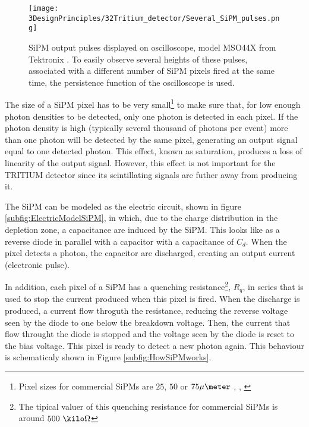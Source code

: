 \begin{figure}[h]
\centering
\texttt{[image: 3DesignPrinciples/32Tritium\_detector/Several\_SiPM\_pulses.png]}
\caption{SiPM output pulses displayed on oscilloscope, model MSO44X from Tektronix \cite{Oscilloscope}. To easily observe several heights of these pulses, associated with a different number of  SiPM pixels fired at the same time, the persistence function of the oscilloscope is used.\label{fig:PulsesOfSiPM}}
\end{figure}

The size of a SiPM pixel has to be very small\footnote{Pixel sizes for commercial SiPMs are $25$, $50$ or $75\mu\meter$ \cite{DataSheetHammamatsu_1_SiPM_25}, \cite{DataSheetHammamatsu_1_SiPM_50}, \cite{DataSheetHammamatsu_1_SiPM_75}} to make sure that, for low enough photon densities to be detected, only one photon is detected in each pixel. If the photon density is high (typically several thousand of photons per event) more than one photon will be detected by the same pixel, generating an output signal equal to one detected photon. This effect, known as saturation, produces a loss of linearity of the output signal. However, this effect is not important for the TRITIUM detector since its scintillating signals are futher away from producing it. %

The SiPM can be modeled as the electric circuit, shown in figure \ref{subfig:ElectricModelSiPM}, in which, due to the charge distribution in the depletion zone, a capacitance are induced by the SiPM. This looks like as a reverse diode in parallel with a capacitor with a capacitance of $C_d$. When the pixel detects a photon, the capacitor are discharged, creating an output current (electronic pulse).

In addition, each pixel of a SiPM has a quenching resistance\footnote{The tipical valuer of this quenching resistance for commercial SiPMs is around $500~\kilo\Omega$}, $R_q$, in series that is used to stop the current produced when this pixel is fired. When the discharge is produced, a current flow throguth the resistance, reducing the reverse voltage seen by the diode to one below the breakdown voltage. Then, the current that flow throught the diode is stopped and the voltage seen by the diode is reset to the bias voltage. This pixel is ready to detect a new photon again. This behaviour is schematicaly shown in Figure \ref{subfig:HowSiPMworks}.

